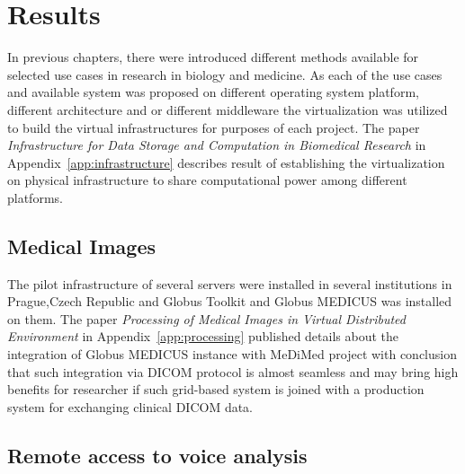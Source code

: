 \chapter{Results}
\label{sec:results}
In previous chapters, there were introduced different methods available for selected use cases in research in biology and medicine. 
As each of the use cases and available system was proposed on different operating system platform, different architecture and or different middleware the virtualization was utilized to build the virtual infrastructures for purposes of each project. The paper \cite{kulhanek2010c} \emph{Infrastructure for Data Storage and Computation in Biomedical Research} in Appendix~\ref{app:infrastructure} describes result of establishing the virtualization on physical infrastructure to share computational power among different platforms.

\section{Medical Images}
\label{sec:resultsimages}


The pilot infrastructure of several servers were installed in several institutions in Prague,Czech Republic and Globus Toolkit and Globus MEDICUS was installed on them. The paper \cite{kulhanek2009}  \emph{Processing of Medical Images in Virtual Distributed Environment} in Appendix~\ref{app:processing} published details about the integration of Globus MEDICUS instance with MeDiMed project with conclusion that such integration via DICOM protocol is almost seamless and may bring high benefits for researcher if such grid-based system is joined with a production system for exchanging clinical DICOM data. 

\section{Remote access to voice analysis}
\label{sec:resultsvoice}

